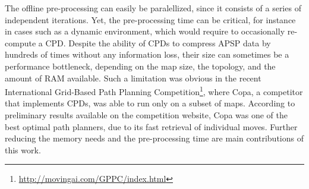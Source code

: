 \documentclass[runningheads,a4paper]{llncs}
\begin{document}
The offline pre-processing can easily be paralellized, since it consists of a
series of independent iterations. Yet, the pre-processing time can be critical, for
instance in cases such as a dynamic environment, which would require to
occasionally re-compute a CPD.
Despite the ability of CPDs to compress APSP data by hundreds of times without
any information loss, their size can sometimes be a performance bottleneck,
depending on the map size, the topology, and the amount of RAM available.
Such a limitation was obvious in the recent International Grid-Based Path
Planning Competition\footnote{{\url {http://movingai.com/GPPC/index.html}}}, where Copa,
a competitor that implements CPDs, was able to run only on a subset of maps.
According to preliminary results available on the competition website, Copa
was one of the best optimal path planners, due to its fast retrieval of
individual moves.
Further reducing the memory needs and the pre-processing time
are main contributions of this work.
\end{document}
